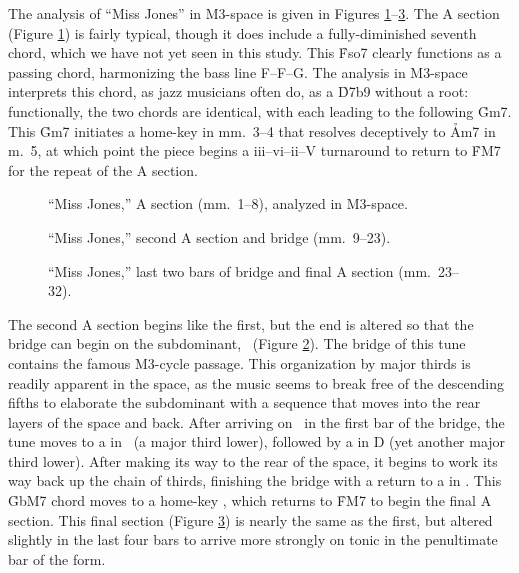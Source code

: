 The analysis of ``Miss Jones'' in M3-space is given in Figures
\ref{maj3:miss-jones-a}--\ref{maj3:miss-jones-c}. The A section (Figure
\ref{maj3:miss-jones-a}) is fairly typical, though it does include a
fully-diminished seventh chord, which we have not yet seen in this study. This
\h{Fso7} clearly functions as a passing chord, harmonizing the bass line
F--F\sharp--G. The analysis in M3-space interprets this chord, as jazz
musicians often do, as a \h{D7b9} without a root: functionally, the two chords
are identical, with each leading to the following \h{Gm7}. This
\h{Gm7} initiates a home-key \tf in mm.~3--4 that resolves deceptively to
\h{Am7} in m.~5, at which point the piece begins a iii--vi--ii--V turnaround
to return to \h{FM7} for the repeat of the A section.

\begin{figure}[tbp]
  \ContinuedFloat
  \caption{``Miss Jones,'' A section (mm.~1--8), analyzed in M3-space.}
\label{maj3:miss-jones-a}
\end{figure}

\begin{figure}[tbp]
  \ContinuedFloat
  \caption{``Miss Jones,'' second A section and bridge (mm.~9--23).}
\label{maj3:miss-jones-b}
\end{figure}

\begin{figure}[tbp]
  \ContinuedFloat
  \caption{``Miss Jones,'' last two bars of bridge and final A section
    (mm.~23--32).}
\label{maj3:miss-jones-c}
\end{figure}

The second A section begins like the first, but the end is altered so that the
bridge can begin on the subdominant, \Bflat\ (Figure \ref{maj3:miss-jones-b}).
The bridge of this tune contains the famous M3-cycle passage. This
organization by major thirds is readily apparent in the space, as the music
seems to break free of the descending fifths to elaborate the subdominant
with a sequence that moves into the rear layers of the space and back. After
arriving on \Bflat\ in the first bar of the bridge, the tune moves to a \tfo
in \Gflat\ (a major third lower), followed by a \tfo in D (yet another major
third lower). After making its way to the rear of the space, it begins to work
its way back up the chain of thirds, finishing the bridge with a return to a
\tfo in \Gflat. This \h{GbM7} chord moves to a home-key \tfo, which returns to
\h{FM7} to begin the final A section. This final section (Figure
\ref{maj3:miss-jones-c}) is nearly the same as the first, but altered slightly
in the last four bars to arrive more strongly on tonic in the penultimate bar
of the form.

